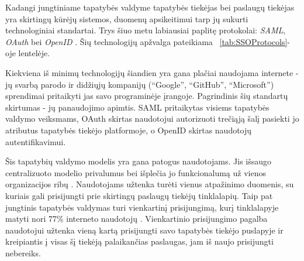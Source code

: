 
Kadangi jungtiniame tapatybės valdyme tapatybės tiekėjas bei paslaugų tiekėjas yra skirtingų kūrėjų sistemos,
duomenų apsikeitimui tarp jų sukurti technologiniai standartai. Trys šiuo metu labiausiai paplitę protokolai: \textit{SAML}, \textit{OAuth} bei \textit{OpenID}
\cite{OIDvsOAuthvsSAML}. Šių technologijų
apžvalga pateikiama ~\ref{tab:SSOProtocols}-oje lentelėje.



Kiekviena iš minimų technologijų šiandien yra gana plačiai naudojama internete - jų svarbą parodo
ir didžiųjų kompanijų (\enquote{Google}, \enquote{GitHub}, \enquote{Microsoft}) sprendimai pritaikyti jas savo
programinėje įrangoje. Pagrindinis šių standartų skirtumas - jų panaudojimo apimtis. SAML pritaikytas visiems tapatybės valdymo
veiksmams, OAuth skirtas naudotojui autorizuoti trečiąją šalį pasiekti jo atributus tapatybės tiekėjo platformoje,
o OpenID skirtas naudotojų autentifikavimui.


Šis tapatybių valdymo modelis yra gana patogus naudotojams. Jis išsaugo centralizuoto modelio privalumus 
bei išplečia jo funkcionalumą už vienos organizacijos ribų \cite{OIDvsOAuthvsSAML}. Naudotojams užtenka turėti vienus atpažinimo duomenis, su kuriais
gali prisijungti prie skirtingų paslaugų tiekėjų tinklalapių. Taip pat jungtinis tapatybės valdymas turi vienkartinį prisijungimą,
kurį tinklalapyje matyti nori 77\% interneto naudotojų \cite{SSOResearch}. Vienkartinio prisijungimo pagalba naudotojui užtenka vieną kartą
prisijungti savo tapatybės tiekėjo puslapyje ir kreipiantis į visas šį tiekėją palaikančias paslaugas, jam iš naujo prisijungti nebereiks.

